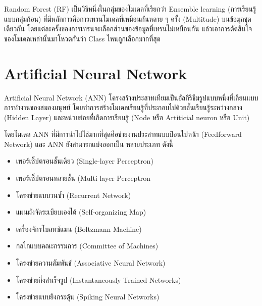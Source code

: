 Random Forest (RF) เป็นวิธีหนึ่งในกลุ่มของโมเดลที่เรียกว่า Ensemble learning (การเรียนรู้แบบกลุ่มก้อน) 
ที่มีหลักการคือการเทรนโมเดลที่เหมือนกันหลาย ๆ ครั้ง (Multitude) บนข้อมูลชุดเดียวกัน โดยแต่ละครั้งของการเทรนจะเลือกส่วนของข้อมูลที่เทรนไม่เหมือนกัน 
แล้วเอาการตัดสินใจของโมเดลเหล่านั้นมาโหวตกันว่า Class ไหนถูกเลือกมากที่สุด\cite{breiman2001,quinlan1986}

\section{Artificial Neural Network}

Artificial Neural Network (ANN) โครงสร้างประสาทเทียมเป็นอัลกิริธึมรูปแบบหนึ่งที่เลียนแบบการทำงานของสมองมนุษย์
โดยทำการสร้างโมเดลเรียนรู้ที่ประกอบไปด้วยชั้นเรียนรู้ระหว่างกลาง (Hidden Layer) และหน่วยย่อยที่เกิดการเรียนรู้ (Node หรือ Artiticial neuron หรือ Unit)

โดยโมเดล ANN ที่มีการนำไปใช้มากที่สุดคือข่ายงานประสาทแบบป้อนไปหน้า (Feedforward Network) และ ANN ยังสามารถแบ่งออกเป็น
หลายประเภท ดังนี้

\begin{itemize}
    \item เพอร์เซ็ปตรอนชั้นเดียว (Single-layer Perceptron)
    \item เพอร์เซ็ปตรอนหลายชั้น (Multi-layer Perceptron
    \item โครงข่ายแบบวนซ้ำ (Recurrent Network)
    \item แผนผังจัดระเบียบเองได้ (Self-organizing Map)
    \item เครื่องจักรโบลทซ์แมน (Boltzmann Machine)
    \item กลไกแบบคณะกรรมการ (Committee of Machines)
    \item โครงข่ายความสัมพันธ์ (Associative Neural Network)
    \item โครงข่ายกึ่งสำเร็จรูป (Instantaneously Trained Networks)
    \item โครงข่ายแบบยิงกระตุ้น (Spiking Neural Networks) 
\end{itemize}
